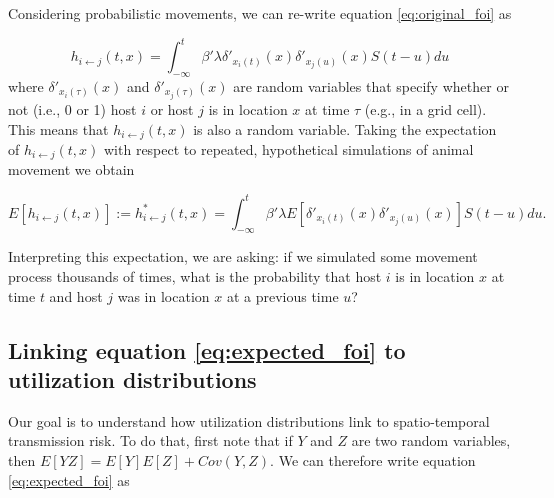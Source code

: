 \documentclass[letterpaper]{article}
\begin{document}
Considering probabilistic movements, we can re-write equation \ref{eq:original_foi} as

\begin{equation}
    h_{i \leftarrow j}(t, x) = \int_{-\infty}^{t} \beta' \lambda \delta'_{x_i(t)}(x) \delta'_{x_j(u)}(x) S(t - u) du
    \label{eq:prob_foi}
\end{equation}
where $\delta'_{x_i(\tau)}(x)$ and $\delta'_{x_j(\tau)}(x)$ are random variables that specify whether or not (i.e., 0 or 1) host $i$ or host $j$ is in location $x$ at time $\tau$ (e.g., in a grid cell).  This means that $h_{i \leftarrow j}(t, x)$ is also a random variable. 
Taking the expectation of $h_{i \leftarrow j}(t, x)$ with respect to repeated, hypothetical simulations of animal movement we obtain

\begin{equation}
    E[h_{i \leftarrow j}(t, x)] := h^*_{i \leftarrow j}(t, x) = \int_{-\infty}^{t} \beta' \lambda E[\delta'_{x_i(t)}(x) \delta'_{x_j(u)}(x)] S(t - u) du.
    \label{eq:expected_foi}
\end{equation}

Interpreting this expectation, we are asking: if we simulated some movement process thousands of times, what is the probability that host $i$ is in location $x$ at time $t$ and host $j$ was in location $x$ at a previous time $u$? 

\subsection*{Linking equation \ref{eq:expected_foi} to utilization distributions}

Our goal is to understand how utilization distributions link to spatio-temporal transmission risk.  To do that, first note that if $Y$ and $Z$ are two random variables, then $E[YZ] = E[Y]E[Z] + Cov(Y, Z)$.  We can therefore write equation \ref{eq:expected_foi} as
\end{document}
